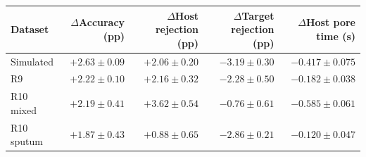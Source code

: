 \begin{tabular}{@{}lrrrr@{}}
\toprule
Dataset & $\Delta$Accuracy (pp) & $\Delta$Host rejection (pp) & $\Delta$Target rejection (pp) & $\Delta$Host pore time (s)\\\midrule
Simulated & $+2.63 \pm 0.09$ & $+2.06 \pm 0.20$ & $-3.19 \pm 0.30$ & $-0.417 \pm 0.075$\\
R9 & $+2.22 \pm 0.10$ & $+2.16 \pm 0.32$ & $-2.28 \pm 0.50$ & $-0.182 \pm 0.038$\\
R10 mixed & $+2.19 \pm 0.41$ & $+3.62 \pm 0.54$ & $-0.76 \pm 0.61$ & $-0.585 \pm 0.061$\\
R10 sputum & $+1.87 \pm 0.43$ & $+0.88 \pm 0.65$ & $-2.86 \pm 0.21$ & $-0.120 \pm 0.047$\\
\bottomrule
\end{tabular}
